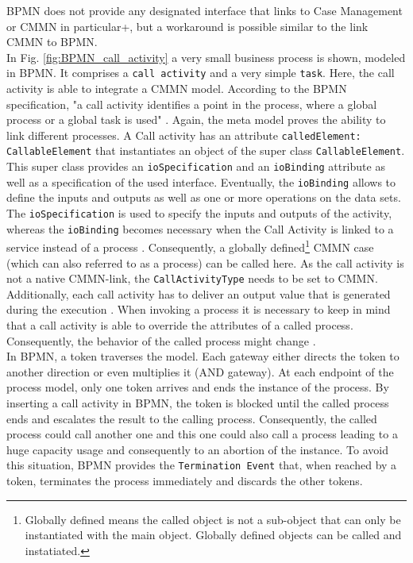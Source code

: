 BPMN does not provide any designated interface that links to Case Management or CMMN in particular+, but a workaround is possible similar to the link CMMN to BPMN. \\
In Fig. \ref{fig:BPMN_call_activity} a very small business process is shown, modeled in BPMN. It comprises a \texttt{call activity} and a very simple \texttt{task}. Here, the call activity is able to integrate a CMMN model. According to the BPMN specification, "a call activity identifies a point in the process, where a global process or a global task is used" \cite{BPMNspec}. Again, the meta model proves the ability to link different processes. A Call activity has an attribute \texttt{calledElement: CallableElement} that instantiates an object of the super class \texttt{CallableElement}. This super class provides an \texttt{ioSpecification} and an \texttt{ioBinding} attribute as well as a specification of the used interface. Eventually, the \texttt{ioBinding} allows to define the inputs and outputs as well as one or more operations on the data sets. The \texttt{ioSpecification} is used to specify the inputs and outputs of the activity, whereas the \texttt{ioBinding} becomes necessary when the Call Activity is linked to a service instead of a process \cite{BPMNspec}.
Consequently, a globally defined\footnote{Globally defined means the called object is not a sub-object that can only be instantiated with the main object. Globally defined objects can be called and instatiated.} CMMN case (which can also referred to as a process) can be called here. As the call activity is not a native CMMN-link, the \texttt{CallActivityType} needs to be set to CMMN. Additionally, each call activity has to deliver an output value that is generated during the execution \cite{BPMNspec}. When invoking a process it is necessary to keep in mind that a call activity is able to override the attributes of a called process. Consequently, the behavior of the called process might change \cite{BPMNspec}.\\

In BPMN, a token traverses the model. Each gateway either directs the token to another direction or even multiplies it (AND gateway). At each endpoint of the process model, only one token arrives and ends the instance of the process. By inserting a call activity in BPMN, the token is blocked until the called process ends and escalates the result to the calling process. Consequently, the called process could call another one and this one could also call a process leading to a huge capacity usage and consequently to an abortion of the instance. To avoid this situation, BPMN provides the \texttt{Termination Event} that, when reached by a token, terminates the process immediately and discards the other tokens.

